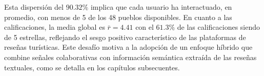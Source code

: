 Esta dispersión del $90.32\%$ implica que cada usuario ha interactuado, en promedio, con menos de 5 de los 48 pueblos disponibles. En cuanto a las calificaciones, la media global es $\bar{r} = 4.41$ con el $61.3\%$ de las calificaciones siendo de 5 estrellas, reflejando el sesgo positivo característico de las plataformas de reseñas turísticas. Este desafío motiva a la adopción de un enfoque híbrido que combine señales colaborativas con información semántica extraída de las reseñas textuales, como se detalla en los capítulos subsecuentes.
